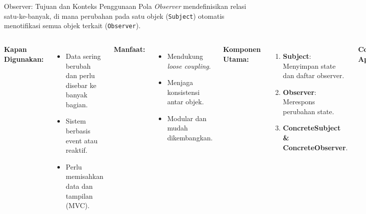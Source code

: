 \documentclass[aspectratio=169, table]{beamer}
\begin{document}
\begin{frame}{Observer: Tujuan dan Konteks Penggunaan}
	\vspace{15pt}
	Pola \textit{Observer} mendefinisikan relasi satu-ke-banyak, di mana perubahan pada satu objek (\texttt{Subject}) otomatis menotifikasi semua objek terkait (\texttt{Observer}).
	
	\vspace{5pt}
	\begin{columns}[T]
		\textbf{Kapan Digunakan:}
		\begin{itemize}
			\item Data sering berubah dan perlu disebar ke banyak bagian.
			\item Sistem berbasis event atau reaktif.
			\item Perlu memisahkan data dan tampilan (MVC).
		\end{itemize}
		\textbf{Manfaat:}
		\begin{itemize}
			\item Mendukung \textit{loose coupling}.
			\item Menjaga konsistensi antar objek.
			\item Modular dan mudah dikembangkan.
		\end{itemize}
		
		
		
		\textbf{Komponen Utama:}
		\begin{enumerate}
			\item \textbf{Subject}: Menyimpan state dan daftar observer.
			\item \textbf{Observer}: Merespons perubahan state.
			\item \textbf{ConcreteSubject \& ConcreteObserver}.
		\end{enumerate}
		\textbf{Contoh Aplikasi:}
		\begin{itemize}
			\item GUI (Swing, JavaFX)
			\item Event handler
			\item Publish-subscribe
		\end{itemize}
	\end{columns}
\end{frame}
\end{document}
